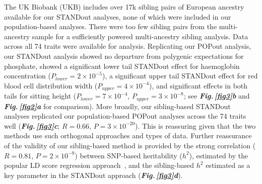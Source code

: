 \documentclass[12pt]{zHenriquesLab-StyleBioRxiv}
\newcommand\dref[2]{\normalsize{\textbf{\textit{Fig.\,\ref{#1}#2}}}\normalsize{}}
\begin{document}
{{The UK Biobank (UKB) includes over 17k sibling pairs of European ancestry available for our STANDout analyses, 
none of which were included in our population-based analyses. There were too few sibling pairs from the 
multi-ancestry sample for a sufficiently powered multi-ancestry sibling analysis. 
Data across all 74 traits were available for analysis. Replicating our POPout analysis, 
our STANDout analysis showed no departure from polygenic expectations for phosphate, showed 
a significant lower tail STANDout effect for haemoglobin concentration ($P_{lower}=2 \times 10^{-5}$), a 
significant upper tail STANDout effect for red blood cell distribution width ($P_{upper}=4 \times 10^{-4}$), 
and significant effects in both tails for sitting height 
($P_{lower}=7 \times 10^{-4}$, $P_{upper}=3 \times 10^{-8}$; see \dref{fig3}{b} and \dref{fig2}{a} for comparison). 
More broadly, our sibling-based STANDout analyses replicated our population-based POPout analyses across 
the 74 traits well (\dref{fig3}{c}; $R = 0.66$, $P = 3 \times 10^{-20}$). This is reassuring given that the 
two methods use such orthogonal approaches and types of data. Further reassurance of the validity of our 
sibling-based method is provided by the strong correlation ($R = 0.81$, $P = 2 \times 10^{-9}$) between 
SNP-based heritability ($h^2$), estimated by the popular LD score regression approach~\cite{BulikSullivan2015}, 
and the sibling-based $h^2$ estimated as a key parameter in the STANDout approach \cite{Souaiaia2024}  (\dref{fig3}{d}).

%
}}
\end{document}
